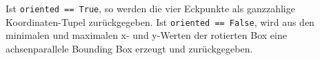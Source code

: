 Ist \lstinline|oriented == True|, so werden die vier Eckpunkte als ganzzahlige Koordinaten-Tupel zurückgegeben. Ist \lstinline|oriented == False|, wird aus den minimalen und maximalen x- und y-Werten der rotierten Box eine achsenparallele Bounding Box erzeugt und zurückgegeben.


